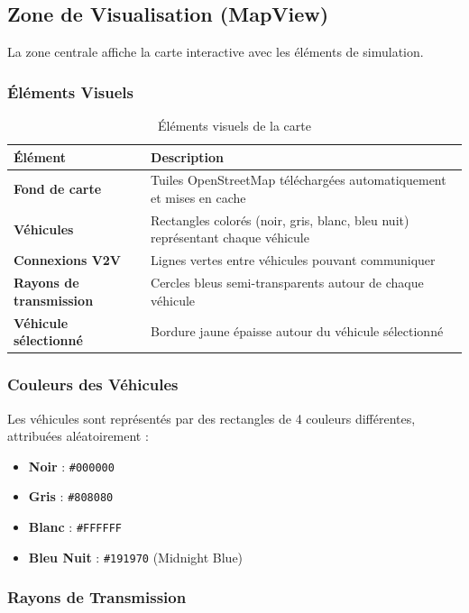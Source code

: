 \documentclass[12pt,a4paper]{article}
\begin{document}
\subsection{Zone de Visualisation (MapView)}

La zone centrale affiche la carte interactive avec les éléments de simulation.

\subsubsection{Éléments Visuels}

\begin{table}[H]
\centering
\begin{tabular}{lp{10cm}}
\toprule
\textbf{Élément} & \textbf{Description} \\
\midrule
\textbf{Fond de carte} & Tuiles OpenStreetMap téléchargées automatiquement et mises en cache \\
\textbf{Véhicules} & Rectangles colorés (noir, gris, blanc, bleu nuit) représentant chaque véhicule \\
\textbf{Connexions V2V} & Lignes vertes entre véhicules pouvant communiquer \\
\textbf{Rayons de transmission} & Cercles bleus semi-transparents autour de chaque véhicule \\
\textbf{Véhicule sélectionné} & Bordure jaune épaisse autour du véhicule sélectionné \\
\bottomrule
\end{tabular}
\caption{Éléments visuels de la carte}
\end{table}

\subsubsection{Couleurs des Véhicules}

Les véhicules sont représentés par des rectangles de 4 couleurs différentes, attribuées aléatoirement :

\begin{itemize}
    \item \textbf{Noir} : \texttt{\#000000}
    \item \textbf{Gris} : \texttt{\#808080}
    \item \textbf{Blanc} : \texttt{\#FFFFFF}
    \item \textbf{Bleu Nuit} : \texttt{\#191970} (Midnight Blue)
\end{itemize}

\subsubsection{Rayons de Transmission}
\end{document}
